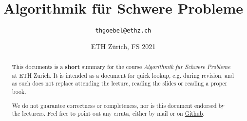 \documentclass[paper=a4, parskip=half-]{scrartcl}
\title{Algorithmik für Schwere Probleme}
\author{\texttt{thgoebel@ethz.ch}}
\date{ETH Zürich, FS 2021}
\begin{document}
\begin{titlepage}
\maketitle
\vspace{5cm}
\thispagestyle{empty}


\begin{abstract}
This documents is a \textbf{short} summary for the course
\textit{Algorithmik für Schwere Probleme} at ETH Zurich.
It is intended as a document for quick lookup, e.g. during revision,
and as such does not replace attending the lecture, reading the slides or reading a proper book.

We do not guarantee correctness or completeness, nor is this document endorsed by the lecturers.
Feel free to point out any errata, either by mail or on
\href{https://github.com/eth-cs-student-summaries/Algorithmik-fuer-Schwere-Probleme/}{Github}.
\end{abstract}

\end{titlepage}

\tableofcontents
\newpage

\newpage


\newpage


\newpage


\newpage


\newpage


\newpage
\end{document}
